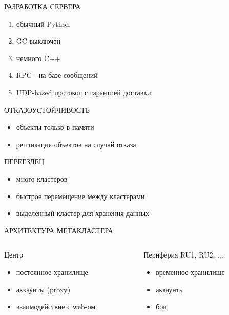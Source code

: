 \documentclass[aspectratio=169]{beamer}
\begin{document}
\begin{frame}{РАЗРАБОТКА СЕРВЕРА}
    \begin{enumerate}
        \item обычный Python
        \item GC выключен
        \item немного C++
        \item RPC - на базе сообщений
        \item UDP-based протокол с гарантией доставки
    \end{enumerate}
\end{frame}

\begin{frame}{ОТКАЗОУСТОЙЧИВОСТЬ}
    \begin{itemize}
        \item объекты только в памяти
        \item репликация объектов на случай отказа
    \end{itemize}
\end{frame}

\begin{frame}{ПЕРЕЕЗДЕЦ}
    \begin{itemize}
        \item много кластеров
        \item быстрое перемещение между кластерами
        \item выделенный кластер для хранения данных
    \end{itemize}
\end{frame}

\begin{frame}{АРХИТЕКТУРА МЕТАКЛАСТЕРА}
    \begin{columns}

    \begin{column}{0.5\textwidth}
    \begin{block}{Центр}
        \begin{itemize}
            \item постоянное хранилище
            \item аккаунты (proxy)
            \item взаимодействие с web-ом
        \end{itemize}
    \end{block}
    \end{column}
    
    \begin{column}{0.5\textwidth}
    \begin{block}{Периферия RU1, RU2, ...}
        \begin{itemize}
            \item временное хранилище
            \item аккаунты
            \item бои
        \end{itemize}
    \end{block}
    \end{column}

    \end{columns}
\end{frame}
\end{document}
